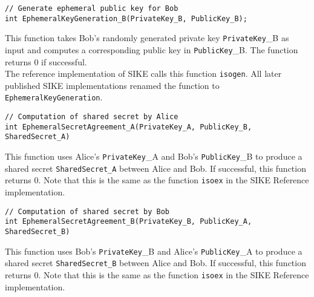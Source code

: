 \begin{lstlisting}[]
// Generate ephemeral public key for Bob
int EphemeralKeyGeneration_B(PrivateKey_B, PublicKey_B);
\end{lstlisting}
This function takes Bob's randomly generated private key \textcolor{keywordcol}{\texttt{PrivateKey}\_B} as input and computes a corresponding public key in \textcolor{keywordcol}{\texttt{PublicKey}\_B}. The function returns 0 if successful.\\
The reference implementation of SIKE calls this function \texttt{isogen}. All later published SIKE implementations renamed the function to \texttt{EphemeralKeyGeneration}.

\begin{lstlisting}[]
// Computation of shared secret by Alice
int EphemeralSecretAgreement_A(PrivateKey_A, PublicKey_B, SharedSecret_A)
\end{lstlisting}
This function uses Alice's \textcolor{keywordcol}{\texttt{PrivateKey}\_A} and Bob's \textcolor{keywordcol}{\texttt{PublicKey}\_B} to produce a shared secret \textcolor{keywordcol}{\texttt{SharedSecret\_A}} between Alice and Bob. If successful, this function returns 0. 
Note that this is the same as the function \texttt{isoex} in the SIKE Reference implementation.

\begin{lstlisting}[]
// Computation of shared secret by Bob
int EphemeralSecretAgreement_B(PrivateKey_B, PublicKey_A, SharedSecret_B)
\end{lstlisting}
This function uses Bob's \textcolor{keywordcol}{\texttt{PrivateKey}\_B} and Alice's \textcolor{keywordcol}{\texttt{PublicKey}\_A} to produce a shared secret \textcolor{keywordcol}{\texttt{SharedSecret\_B}} between Alice and Bob. If successful, this function returns 0. 
Note that this is the same as the function \texttt{isoex} in the SIKE Reference implementation.




